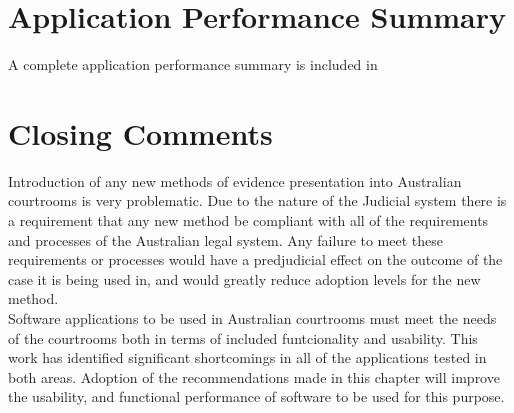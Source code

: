 \section{Application Performance Summary}
A complete application performance summary is included in 

\section{Closing Comments}

Introduction of any new methods of evidence presentation into Australian courtrooms is very problematic. Due to the nature of the Judicial system there is a requirement that any new method be compliant with all of the requirements and processes of the Australian legal system. Any failure to meet these requirements or processes would have a predjudicial effect on the outcome of the case it is being used in, and would greatly reduce adoption levels for the new method.\\

Software applications to be used in Australian courtrooms must meet the needs of the courtrooms both in terms of included funtcionality and usability. This work has identified significant shortcomings in all of the applications tested in both areas. Adoption of the recommendations made in this chapter will improve the usability, and functional performance of software to be used for this purpose.\\




